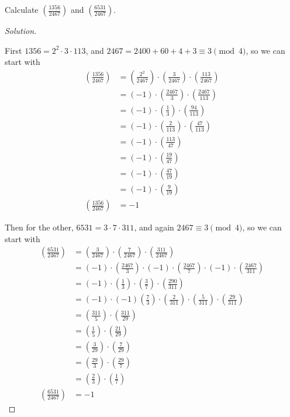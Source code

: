\documentclass[11pt]{article}
\newcommand\leg[2]{\left(\frac{#1}{#2}\right)}
\newenvironment{problem}[2][Problem]{\begin{trivlist}
\item[\hskip \labelsep {\bfseries #1}\hskip \labelsep {\bfseries #2.}]}{\end{trivlist}}
\newenvironment{solution}
  {\renewcommand\qedsymbol{$~$}\begin{proof}[Solution]$ $\par\nobreak\ignorespaces}
  {\end{proof}}
\begin{document}
\begin{problem}{10}
Calculate $\leg{1356}{2467}$ and $\leg{6531}{2467}$.
\end{problem}

\begin{solution}
  First $1356=2^2\cdot 3\cdot 113$, and $2467 = 2400 + 60 + 4 + 3 \equiv 3 \pmod{4}$, so we can start with
  \begin{align*}
    \leg{1356}{2467} & = \leg{2^2}{2467} \cdot \leg{3}{2467} \cdot \leg{113}{2467} \\
                     & = (-1) \cdot \leg{2467}{3} \cdot \leg{2467}{113}            \\
                     & = (-1) \cdot \leg{1}{3} \cdot \leg{94}{113}                 \\
                     & = (-1) \cdot \leg{2}{113} \cdot \leg{47}{113}               \\
                     & = (-1) \cdot \leg{113}{47}                                  \\
                     & = (-1) \cdot \leg{19}{47}                                   \\
                     & = (-1) \cdot \leg{47}{19}                                   \\
                     & = (-1) \cdot \leg{9}{19}                                    \\
    \leg{1356}{2467} & = -1
  \end{align*}

  Then for the other, $6531=3\cdot 7 \cdot 311$, and again $2467\equiv 3\pmod{4}$, so we can start with
  \begin{align*}
    \leg{6531}{2467} & = \leg{3}{2467} \cdot \leg{7}{2467} \cdot \leg{311}{2467}                                  \\
                     & = (-1) \cdot \leg{2467}{3} \cdot (-1) \cdot \leg{2467}{7} \cdot (-1) \cdot \leg{2467}{311} \\
                     & = (-1) \cdot \leg{1}{3} \cdot \leg{3}{7} \cdot \leg{290}{311}                              \\
                     & = (-1) \cdot (-1) \leg{7}{3} \cdot \leg{2}{311} \cdot \leg{5}{311} \cdot \leg{29}{311}     \\
                     & = \leg{311}{5} \cdot \leg{311}{29}                                                         \\
                     & = \leg{1}{5} \cdot \leg{21}{29}                                                            \\
                     & = \leg{3}{29} \cdot \leg{7}{29}                                                            \\
                     & = \leg{29}{3} \cdot \leg{29}{7}                                                            \\
                     & = \leg{2}{3} \cdot \leg{1}{7}                                                              \\
    \leg{6531}{2467} & = -1
  \end{align*}
\end{solution}
\end{document}
